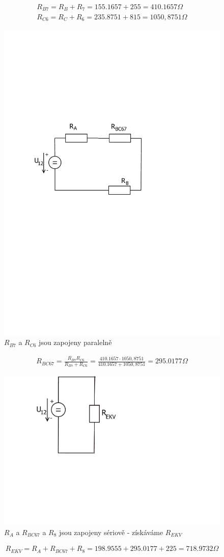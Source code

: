 	\begin{gather*}
		R_{B7} = R_B + R_7 = 155.1657 + 255 = 410.1657 \Omega \\
		R_{C6} = R_C + R_6 =235.8751 + 815 = 1050,8751 \Omega
	\end{gather*}
	\begin{figure}[H]
		\center\includegraphics[width=0.6\linewidth]{obr/1_6}
		\caption{ $R_{B7}$ a $R_{C6}$ jsou zapojeny paralelně}
	\end{figure}
	\begin{gather*}
		R_{BC67} = \frac{R_{B7} R_{C6}}{R_{B7} + R_{C6}} = \frac{410.1657 \cdot 1050,8751}{410.1657 + 1050,8751} = 295.0177 \Omega
	\end{gather*}

	\begin{figure}[H]
		\center\includegraphics[width=0.3\linewidth]{obr/1_7}
		\caption{$R_A$ a $R_{BC67}$ a $R_8$ jsou zapojeny sériově - získáváme $R_{EKV}$}
	\end{figure}
	\begin{gather*}
		R_{EKV} = R_{A} + R_{BC67} + R_8 = 198.9555 + 295.0177 + 225 = 718.9732 \Omega
	\end{gather*}

